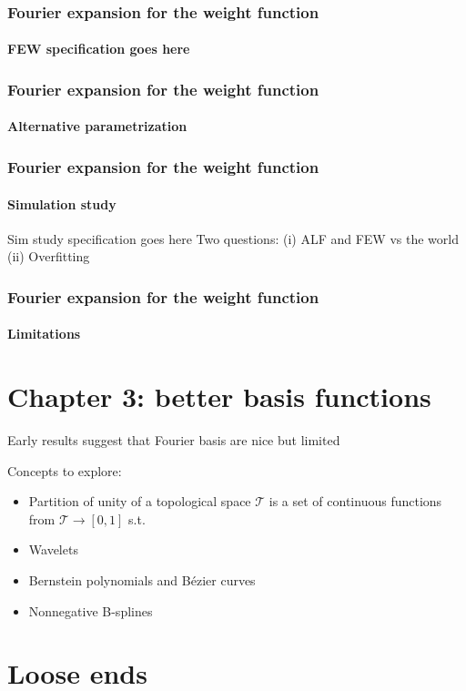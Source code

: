 \documentclass{snedecorbeamer}
\begin{document}
\begin{frame}
  \frametitle{Fourier expansion for the weight function}
  \framesubtitle{FEW specification goes here}

\end{frame}

\begin{frame}
  \frametitle{Fourier expansion for the weight function}
  \framesubtitle{Alternative parametrization}

\end{frame}

\begin{frame}
  \frametitle{Fourier expansion for the weight function}
  \framesubtitle{Simulation study}

  Sim study specification goes here
  Two questions: (i) ALF and FEW vs the world
  (ii) Overfitting

\end{frame}

\begin{frame}
  \frametitle{Fourier expansion for the weight function}
  \framesubtitle{Limitations}

\end{frame}

\section{Chapter 3: better basis functions}

\begin{frame}

  Early results suggest that Fourier basis are nice but limited

  Concepts to explore:
  \begin{itemize}
  \item Partition of unity of a topological space $\mathcal{T}$ is a set of
    continuous functions from $\mathcal{T}\to[0, 1]$ s.t.
  \item Wavelets
  \item Bernstein polynomials and Bézier curves
  \item Nonnegative B-splines
  \end{itemize}
\end{frame}

\section{Loose ends}
\end{document}
